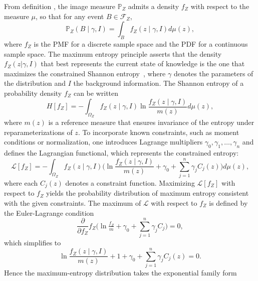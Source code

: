 From definition , the image measure $\mathbb{P}_Z$ admits a density $f_Z$ with respect to the measure $\mu$, so that for any event $B\in \mathcal{F}_Z$,
\begin{equation}
	\mathbb{P}_Z(B \mid\gamma,I) = \int_B f_Z(z\mid \gamma,I) d\mu(z),
	\label{eq:max_ent_probability_measure}
\end{equation}
where $f_Z$ is the PMF for a discrete sample space and the PDF for a continuous sample space. The maximum entropy principle asserts that the density $f_Z(z | \gamma, I)$ that best represents the current state of knowledge is the one that maximizes the constrained Shannon entropy~\citep{Sivia2006}, where $\gamma$ denotes the parameters of the distribution and $I$ the background information. The Shannon entropy of a probability density $f_Z$ can be written
\begin{equation}
	H[f_Z] = - \int_{\Omega_Z} f_Z(z \mid \gamma, I) 
	\ln \frac{f_Z(z \mid \gamma, I)}{m(z)}  d\mu(z),
\end{equation}
where $m(z)$ is a reference measure that ensures invariance of the entropy under reparameterizations of $z$. To incorporate known constraints, such as moment conditions or normalization, one introduces Lagrange multipliers $\gamma_0, \gamma_1, \dots, \gamma_n$ and defines the Lagrangian functional, which represents the constrained entropy:
\begin{equation}
	\mathcal{L}[f_Z] = - \int_{\Omega_Z} 
	f_Z(z \mid \gamma, I) \Bigg(
	\ln \frac{f_Z(z \mid \gamma, I)}{m(z)}
	+ \gamma_0 + \sum_{j=1}^n \gamma_j C_j(z)
	\Bigg) d\mu(z),
\end{equation}
where each $C_j(z)$ denotes a constraint function. Maximizing $\mathcal{L}[f_Z]$ with respect to $f_Z$ yields the probability distribution of maximum entropy consistent with the given constraints. The maximum of $\mathcal{L}$ with respect to $f_Z$ is defined by the Euler-Lagrange condition
\begin{equation}
	\frac{\partial}{\partial f_Z} f_Z\Big(\ln \tfrac{f_Z}{m} + \gamma_0 + \sum_{j=1}^n \gamma_j C_j\Big) = 0,
\end{equation}
which simplifies to
\begin{equation}
	\ln \frac{f_Z(z \mid \gamma, I)}{m(z)} + 1 + \gamma_0 + \sum_{j=1}^n \gamma_j C_j(z) = 0.
\end{equation}
Hence the maximum-entropy distribution takes the exponential family form
